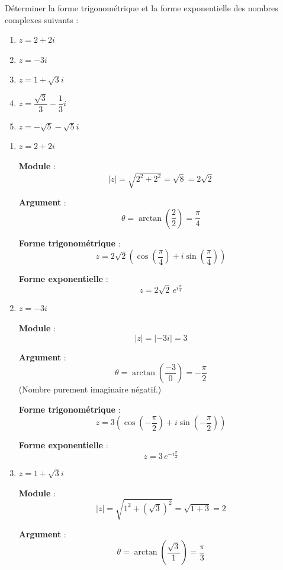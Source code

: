 \documentclass[a4paper,12pt]{article}
\begin{document}
\begin{tcolorbox}[title=Exercice 2 - {[}Calculer{]}]
Déterminer la forme trigonométrique et la forme exponentielle des nombres complexes suivants :
\begin{enumerate}
    \item \( z = 2 + 2i \)
    \item \( z = -3i \)
    \item \( z = 1 + \sqrt{3}i \)
    \item \( z = \dfrac{\sqrt{3}}{3} - \dfrac{1}{3}i \)
    \item \( z = -\sqrt{5} - \sqrt{5}i \)
\end{enumerate}
\end{tcolorbox}

\begin{solutionbox}
\begin{enumerate}
    \item \( z = 2 + 2i \)

    \textbf{Module} :
    \[
    |z| = \sqrt{2^2 + 2^2} = \sqrt{8} = 2\sqrt{2}
    \]

    \textbf{Argument} :
    \[
    \theta = \arctan\left(\dfrac{2}{2}\right) = \dfrac{\pi}{4}
    \]

    \textbf{Forme trigonométrique} :
    \[
    z = 2\sqrt{2} \left( \cos\left(\dfrac{\pi}{4}\right) + i\sin\left(\dfrac{\pi}{4}\right) \right)
    \]

    \textbf{Forme exponentielle} :
    \[
    z = 2\sqrt{2} \, e^{i\frac{\pi}{4}}
    \]

    \item \( z = -3i \)

    \textbf{Module} :
    \[
    |z| = |-3i| = 3
    \]

    \textbf{Argument} :
    \[
    \theta = \arctan\left(\dfrac{-3}{0}\right) = -\dfrac{\pi}{2}
    \]
    (Nombre purement imaginaire négatif.)

    \textbf{Forme trigonométrique} :
    \[
    z = 3 \left( \cos\left( -\dfrac{\pi}{2} \right) + i\sin\left( -\dfrac{\pi}{2} \right) \right)
    \]

    \textbf{Forme exponentielle} :
    \[
    z = 3\, e^{-i\frac{\pi}{2}}
    \]

    \item \( z = 1 + \sqrt{3}i \)

    \textbf{Module} :
    \[
    |z| = \sqrt{1^2 + (\sqrt{3})^2} = \sqrt{1 + 3} = 2
    \]

    \textbf{Argument} :
    \[
    \theta = \arctan\left( \dfrac{\sqrt{3}}{1} \right) = \dfrac{\pi}{3}
    \]


\end{enumerate}
\end{solutionbox}
\end{document}
